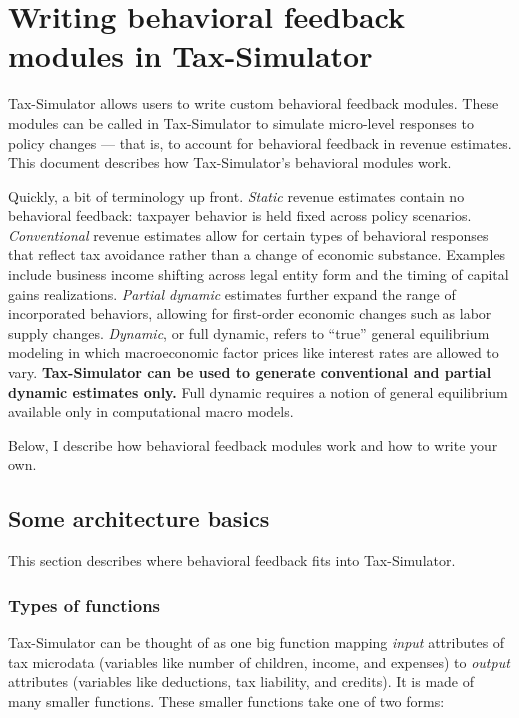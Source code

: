\documentclass[
]{article}
\author{}
\date{\vspace{-2.5em}}
\begin{document}
\hypertarget{writing-behavioral-feedback-modules-in-tax-simulator}{%
\section{Writing behavioral feedback modules in
Tax-Simulator}\label{writing-behavioral-feedback-modules-in-tax-simulator}}

Tax-Simulator allows users to write custom behavioral feedback modules.
These modules can be called in Tax-Simulator to simulate micro-level
responses to policy changes --- that is, to account for behavioral
feedback in revenue estimates. This document describes how
Tax-Simulator's behavioral modules work.

Quickly, a bit of terminology up front. \emph{Static} revenue estimates
contain no behavioral feedback: taxpayer behavior is held fixed across
policy scenarios. \emph{Conventional} revenue estimates allow for
certain types of behavioral responses that reflect tax avoidance rather
than a change of economic substance. Examples include business income
shifting across legal entity form and the timing of capital gains
realizations. \emph{Partial dynamic} estimates further expand the range
of incorporated behaviors, allowing for first-order economic changes
such as labor supply changes. \emph{Dynamic}, or full dynamic, refers to
``true'' general equilibrium modeling in which macroeconomic factor
prices like interest rates are allowed to vary. \textbf{Tax-Simulator
can be used to generate conventional and partial dynamic estimates
only.} Full dynamic requires a notion of general equilibrium available
only in computational macro models.

Below, I describe how behavioral feedback modules work and how to write
your own.

\hypertarget{some-architecture-basics}{%
\subsection{Some architecture basics}\label{some-architecture-basics}}

This section describes where behavioral feedback fits into
Tax-Simulator.

\hypertarget{types-of-functions}{%
\subsubsection{Types of functions}\label{types-of-functions}}

Tax-Simulator can be thought of as one big function mapping \emph{input}
attributes of tax microdata (variables like number of children, income,
and expenses) to \emph{output} attributes (variables like deductions,
tax liability, and credits). It is made of many smaller functions. These
smaller functions take one of two forms:
\end{document}
